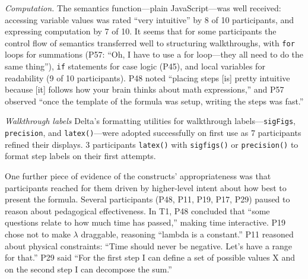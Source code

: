\emph{Computation.} The semantics function---plain JavaScript---was well received: accessing variable values was rated ``very intuitive'' by 8 of 10 participants, and expressing computation by 7 of 10. It seems that for some participants the control flow of semantics transferred well to structuring walkthroughs, with \texttt{for} loops for summations (P57: ``Oh, I have to use a for loop---they all need to do the same thing''), \texttt{if} statements for case logic (P45), and local variables for readability (9 of 10 participants). P48 noted ``placing steps [is] pretty intuitive because [it] follows how your brain thinks about math expressions,'' and P57 observed ``once the template of the formula was setup, writing the steps was fast.''

\emph{Walkthrough labels}
Delta's formatting utilities for walkthrough labels---\texttt{sigFigs}, \texttt{precision}, and \texttt{latex()}---were adopted successfully on first use as 7 participants refined their displays. 3 participants \texttt{latex()} with \texttt{sigfigs()} or \texttt{precision()} to format step labels on their first attempts.

\medskip

One further piece of evidence of the constructs' appropriateness was that participants reached for them driven by higher-level intent about how best to present the formula.
Several participants (P48, P11, P19, P17, P29) paused to reason about pedagogical effectiveness. In T1, P48 concluded that ``some questions relate to how much time has passed,'' making time interactive. P19 chose not to make $\lambda$ draggable, reasoning ``lambda is a constant.'' P11 reasoned about physical constraints: ``Time should never be negative. Let's have a range for that.'' P29 said ``For the first step I can define a set of possible values X and on the second step I can decompose the sum.''

